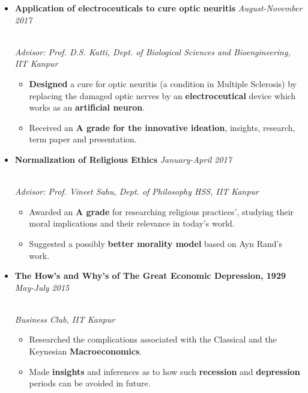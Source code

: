 \documentclass{article}
\begin{document}
\begin{itemize}

\item \textbf{Application of electroceuticals to cure optic neuritis}
     \hfill\textit{August-November 2017}
     
     \vspace{-1mm}
     
     \\[3pt] \textit{\small Advisor: Prof. D.S. Katti, Dept. of Biological Sciences and Bioengineering, IIT Kanpur  }  
    \begin{itemize}
        \item \textbf{Designed} a cure for optic neuritis (a condition in Multiple Sclerosis) by replacing the damaged optic nerves by an \textbf{electroceutical} device which works as an \textbf{artificial neuron}. 
        \item Received an \textbf{A grade for the innovative ideation}, insights, research, term paper and presentation. 
    \end{itemize}
    
  
    
    \item \textbf{Normalization of Religious Ethics}
     \hfill\textit{January-April 2017}
     \vspace{-1mm}
     
     \\[3pt]  \textit{\small Advisor: Prof. Vineet Sahu, Dept. of Philosophy HSS,
     IIT Kanpur  }
    \begin{itemize}
        \item Awarded an \textbf{A grade} for researching religious practices', studying their moral implications and their relevance in today's world.
        \item Suggested a possibly \textbf{better morality model} based on Ayn Rand's work. 
    \end{itemize}
    
    \item \textbf{The How’s and Why’s of The Great Economic Depression, 1929}   \hfill\textit{May-July 2015} \\
    
    \vspace{-1mm}
    
    \\[3pt] \textit{\small Business Club, IIT Kanpur }
    \begin{itemize}
        \item Researched the complications associated with the Classical and the Keynesian \textbf{Macroeconomics}.
        \item Made \textbf{insights} and inferences as to how such \textbf{recession} and \textbf{depression} periods can be avoided in future. 
    \end{itemize}
    
\vspace{-1.5mm}


\end{itemize}
\end{document}
